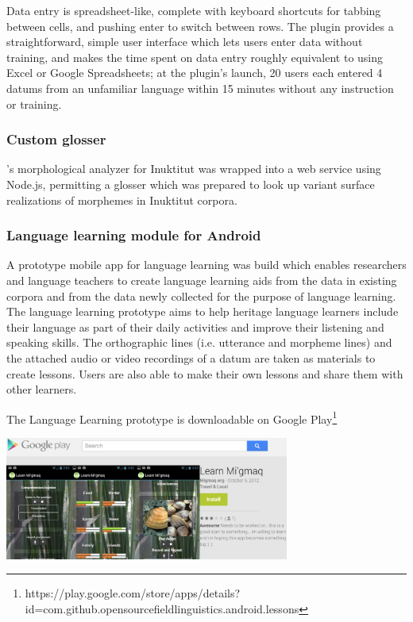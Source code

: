 \documentclass[letterpaper, 12pt, dvips]{mitwpl}
\begin{document}
Data entry is spreadsheet-like, complete with keyboard shortcuts for tabbing between cells, and pushing enter to switch between rows.  The plugin provides a straightforward, simple user interface which lets users enter data without training, and makes the time spent on data entry roughly equivalent to using Excel or Google Spreadsheets; at the plugin's launch, 20 users each entered 4 datums from an unfamiliar language within 15 minutes without any instruction or training.  




\subsubsection{Custom glosser}

\cite{Farley:2014:Online}'s morphological analyzer for Inuktitut was wrapped into a web service using Node.js, permitting a glosser which was prepared to look up variant  surface realizations of morphemes in Inuktitut corpora.

\subsubsection{Language learning module for Android}

A prototype mobile app for language learning was build which  enables researchers and language teachers to create language learning aids from the data in existing corpora and from the data newly collected for the purpose of language learning.
The language learning prototype aims to help heritage language learners include their language as part of their daily activities and improve their listening and speaking skills.
The orthographic lines (i.e.
utterance and morpheme lines) and the attached audio or video recordings of a datum are taken as materials to create lessons. Users are also able to make their own lessons and share them with other learners.

\begin{exe} 
\ex The Language Learning prototype is downloadable on Google Play\footnote{https://play.google.com/store/apps/details?id=com.github.opensourcefieldlinguistics.android.lessons}

 \centering
   \includegraphics[width=0.7\textwidth]{languageLearningApp} 

\label{ex:languageLearningApp}
\end{exe}
\end{document}

